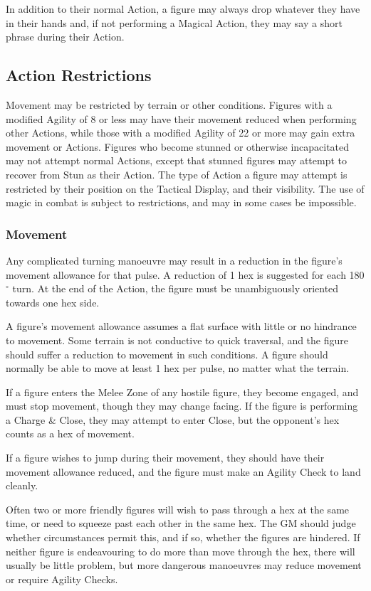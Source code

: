 \begin{multicols*}{3}
In addition to their normal Action, a figure may always drop whatever
they have in their hands and, if not performing a Magical Action, they
may say a short phrase during their Action.

\subsection{Action Restrictions}
\label{combat:restrictions}
Movement may be restricted by terrain or other conditions. Figures
with a modified Agility of 8 or less may have their movement reduced
when performing other Actions, while those with a modified Agility of
22 or more may gain extra movement or Actions. Figures who become
stunned or otherwise incapacitated may not attempt normal Actions,
except that stunned figures may attempt to recover from Stun as their
Action.  The type of Action a figure may attempt is restricted by
their position on the Tactical Display, and their visibility. The use
of magic in combat is subject to restrictions, and may in some cases
be impossible.

\subsubsection{Movement}

Any complicated turning manoeuvre may result in a reduction in the
figure's movement allowance for that pulse. A reduction of 1 hex is
suggested for each 180$^{\circ}$ turn. At the end of the Action, the
figure must be unambiguously oriented towards one hex side.

A figure's movement allowance assumes a flat surface with little or no
hindrance to movement. Some terrain is not conductive to quick
traversal, and the figure should suffer a reduction to movement in
such conditions. A figure should normally be able to move at least 1
hex per pulse, no matter what the terrain.

If a figure enters the Melee Zone of any hostile figure, they become
engaged, and must stop movement, though they may change facing. If the
figure is performing a Charge \& Close, they may attempt to enter
Close, but the opponent's hex counts as a hex of movement.

If a figure wishes to jump during their movement, they should have
their movement allowance reduced, and the figure must make an Agility
Check to land cleanly.

Often two or more friendly figures will wish to pass through a hex at
the same time, or need to squeeze past each other in the same hex. The
GM should judge whether circumstances permit this, and if so, whether
the figures are hindered. If neither figure is endeavouring to do more
than move through the hex, there will usually be little problem, but
more dangerous manoeuvres may reduce movement or require Agility
Checks.


\end{multicols*}

